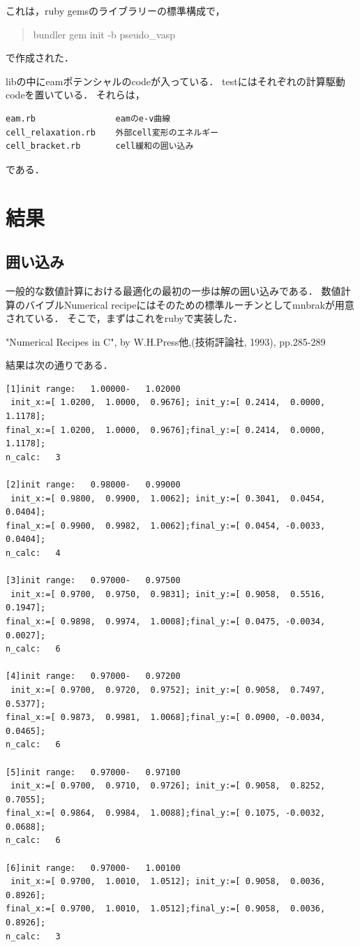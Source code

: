 これは，ruby gemsのライブラリーの標準構成で，

\begin{quote}
bundler gem init -b pseudo\_vasp
\end{quote}
で作成された．

libの中にeamポテンシャルのcodeが入っている．
testにはそれぞれの計算駆動codeを置いている． それらは，

\begin{verbatim}
eam.rb                eamのe-v曲線
cell_relaxation.rb    外部cell変形のエネルギー
cell_bracket.rb       cell緩和の囲い込み
\end{verbatim}

である．

    \section{結果}\label{ux7d50ux679c}

    \subsection{囲い込み}\label{ux56f2ux3044ux8fbcux307f}

一般的な数値計算における最適化の最初の一歩は解の囲い込みである．
数値計算のバイブルNumerical
recipeにはそのための標準ルーチンとしてmnbrakが用意されている．
そこで，まずはこれをrubyで実装した．

"Numerical Recipes in C", by W.H.Press他,(技術評論社, 1993), pp.285-289

結果は次の通りである．

\begin{verbatim}
[1]init range:   1.00000-   1.02000
 init_x:=[ 1.0200,  1.0000,  0.9676]; init_y:=[ 0.2414,  0.0000,  1.1178];
final_x:=[ 1.0200,  1.0000,  0.9676];final_y:=[ 0.2414,  0.0000,  1.1178];
n_calc:   3

[2]init range:   0.98000-   0.99000
 init_x:=[ 0.9800,  0.9900,  1.0062]; init_y:=[ 0.3041,  0.0454,  0.0404];
final_x:=[ 0.9900,  0.9982,  1.0062];final_y:=[ 0.0454, -0.0033,  0.0404];
n_calc:   4

[3]init range:   0.97000-   0.97500
 init_x:=[ 0.9700,  0.9750,  0.9831]; init_y:=[ 0.9058,  0.5516,  0.1947];
final_x:=[ 0.9898,  0.9974,  1.0008];final_y:=[ 0.0475, -0.0034,  0.0027];
n_calc:   6

[4]init range:   0.97000-   0.97200
 init_x:=[ 0.9700,  0.9720,  0.9752]; init_y:=[ 0.9058,  0.7497,  0.5377];
final_x:=[ 0.9873,  0.9981,  1.0068];final_y:=[ 0.0900, -0.0034,  0.0465];
n_calc:   6

[5]init range:   0.97000-   0.97100
 init_x:=[ 0.9700,  0.9710,  0.9726]; init_y:=[ 0.9058,  0.8252,  0.7055];
final_x:=[ 0.9864,  0.9984,  1.0088];final_y:=[ 0.1075, -0.0032,  0.0688];
n_calc:   6

[6]init range:   0.97000-   1.00100
 init_x:=[ 0.9700,  1.0010,  1.0512]; init_y:=[ 0.9058,  0.0036,  0.8926];
final_x:=[ 0.9700,  1.0010,  1.0512];final_y:=[ 0.9058,  0.0036,  0.8926];
n_calc:   3
\end{verbatim}

